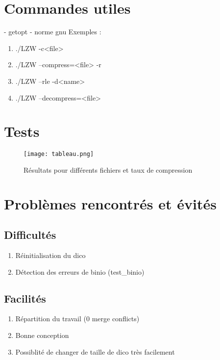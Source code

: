 \documentclass{beamer}
\begin{document}
\section{Commandes utiles}


\begin{frame}
- getopt\newline
- norme gnu\newline
Exemples :
    \begin{enumerate}
    \item ./LZW -c<file>
    \item ./LZW --compress=<file> -r
    \item ./LZW --rle -d<name>
    \item ./LZW --decompress=<file>
    \end{enumerate}
\end{frame}

\section{Tests}

\begin{frame}
    \begin{figure}[h]
    \centering
    \texttt{[image: tableau.png]}
    \caption{Résultats pour différents fichiers et taux de compression}
    \label{resultats}
    \end{figure}
\end{frame}


\section{Problèmes rencontrés et évités}
\subsection{Difficultés}
\begin{frame}
 \begin{enumerate}
  \item Réinitialisation du dico
  \item Détection des erreurs de binio (test\_binio)
 \end{enumerate}
\end{frame}

\subsection{Facilités}
\begin{frame}
 \begin{enumerate}
  \item Répartition du travail (0 merge conflicts)
  \item Bonne conception
  \item Possiblité de changer de taille de dico très facilement
 \end{enumerate}
\end{frame}
\end{document}
